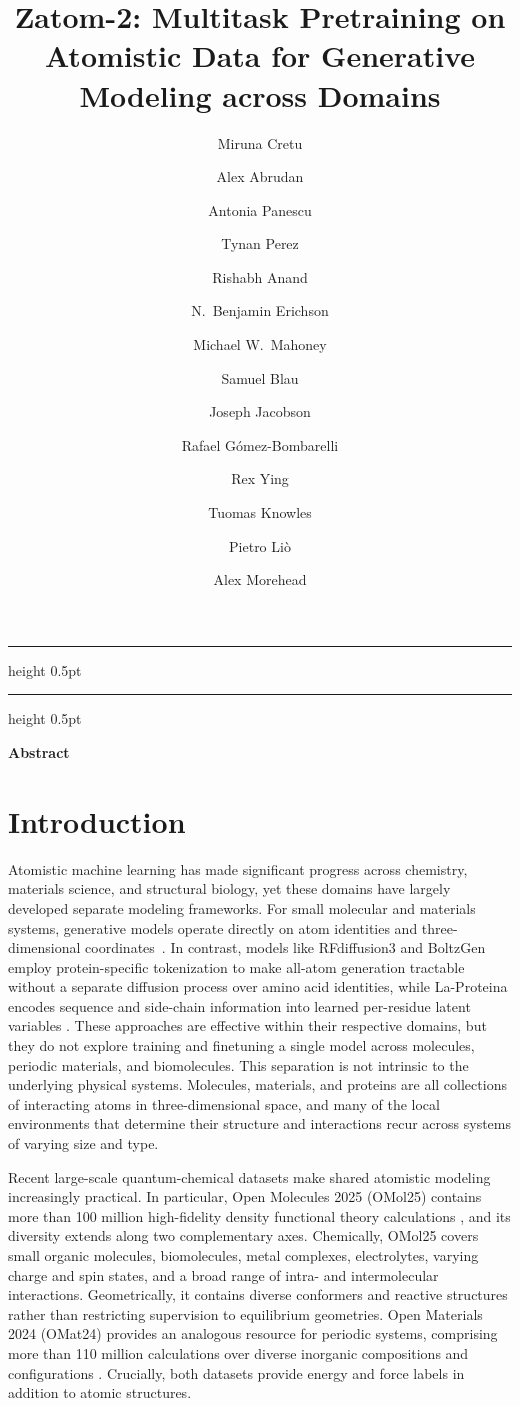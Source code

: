 \documentclass{article} %
\title{Zatom-2: Multitask Pretraining on Atomistic Data for Generative Modeling across Domains}
\author[1,*]{Miruna Cretu}
\author[1,\dagger]{Alex Abrudan}
\author[2,\dagger]{Antonia Panescu}
\author[3,\dagger]{Tynan Perez}
\author[3,\dagger]{Rishabh Anand}
\author[4,5]{N.~Benjamin Erichson}
\author[4,5,6]{Michael W.~Mahoney}
\author[4]{Samuel Blau}
\author[3]{Joseph Jacobson}
\author[3]{Rafael G\'omez-Bombarelli}
\author[2]{Rex Ying}
\author[1]{Tuomas Knowles}
\author[1]{Pietro Li\`{o}}
\author[4,5,*]{Alex Morehead}
\affiliation[1]{University of Cambridge}
\affiliation[2]{Yale University}
\affiliation[3]{MIT}
\affiliation[4]{Lawrence Berkeley National Lab}
\affiliation[5]{International Computer Science Institute}
\affiliation[6]{UC Berkeley}
\makeatletter
\newcommand\authorlist{}
\newcommand\affiliationlist{}
\newcommand\contributionlist{}
\newcommand\metadatalist{}
\newcommand\abstractlist{}
\newcommand\titlelist{}
\newcommand{\@toptitlebar}{%
  {\color{foregroundcolor}\hrule height 0.5pt}
  \vskip 6mm
}
\newcommand{\@bottomtitlebar}{%
  \vskip 6mm
  {\color{foregroundcolor}\hrule height 0.5pt}
}
\newcommand{\mymaketitle}{%
  \thispagestyle{plain}%
  \lhead{Preprint}%
  {%
    \setlength{\parskip}{0mm}%
    \centering

    \noindent
    \begin{minipage}{\textwidth}
        \centering

        \@toptitlebar

        \vspace{1mm}

        {%
          \fontsize{18}{22}\selectfont
          \titlelist\par
        }

        \vspace{1mm}

        \@bottomtitlebar
    \end{minipage}%

    \vskip 5mm

    {\large \authorlist\par}

    \vskip 3mm

    {\normalsize \affiliationlist\par}

    \vskip 2mm

    {\small \contributionlist\par}
  }

  \vskip 5mm

  \begin{tcolorbox}[
    enhanced,
    width=\linewidth,
    colback=boxbackground,
    colframe=boxborder,
    boxrule=0.6pt,
    arc=3.5mm,
    outer arc=3.5mm,
    left=8mm,
    right=8mm,
    top=3mm,
    bottom=6mm,
    drop fuzzy shadow={black!12!white},
    before skip=0pt,
    after skip=0pt
  ]

    \setlength{\parindent}{0pt}
    \setlength{\parskip}{0.55em}

    {\rmfamily\bfseries\color{foregroundcolor} Abstract}

    \vspace{1mm}

    {\color{foregroundcolor}\abstractlist\par}

    \vspace{1mm}

    \ifdefempty{\metadatalist}
      {}
      {%
        \vspace{1mm}
        {\small \metadatalist\par}%
      }

  \end{tcolorbox}

  \vskip 7mm
}
\renewcommand{\maketitle}{\mymaketitle}
\makeatother
\begin{document}
\maketitle

\begingroup
\renewcommand{\thefootnote}{*}
\renewcommand{\thefootnote}{$\dagger$}
\endgroup

\section{Introduction}

Atomistic machine learning has made significant progress across chemistry, materials science, and structural biology, yet these domains have largely developed separate modeling frameworks. For small molecular and materials systems, generative models operate directly on atom identities and three-dimensional coordinates~\citep{hoogeboom2022equivariant,tabasco,jiao2023crystal,zeni2025generative}. In contrast, models like RFdiffusion3 and BoltzGen~\citep{butcher2025rfdiffusion3,stark2025boltzgen} employ protein-specific tokenization to make all-atom generation tractable without a separate diffusion process over amino acid identities, while La-Proteina encodes sequence and side-chain information into learned per-residue latent variables \citep{laproteina}. These approaches are effective within their respective domains, but they do not explore training and finetuning a single model across molecules, periodic materials, and biomolecules. 
This separation is not intrinsic to the underlying physical systems. Molecules, materials, and proteins are all collections of interacting atoms in three-dimensional space, and many of the local environments that determine their structure and interactions recur across systems of varying size and type.

Recent large-scale quantum-chemical datasets make shared atomistic modeling increasingly practical. In particular, Open Molecules 2025 (OMol25) contains more than 100 million high-fidelity density functional theory calculations \citep{levine2025omol25}, and its diversity extends along two complementary axes. Chemically, OMol25 covers small organic molecules, biomolecules, metal complexes, electrolytes, varying charge and spin states, and a broad range of intra- and intermolecular interactions. Geometrically, it contains diverse conformers and reactive structures rather than restricting supervision to equilibrium geometries. Open Materials 2024 (OMat24) provides an analogous resource for periodic systems, comprising more than 110 million calculations over diverse inorganic compositions and configurations \citep{barrosoluque2024omat24}. Crucially, both datasets provide energy and force labels in addition to atomic structures.
\end{document}
